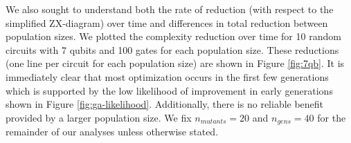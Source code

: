 We also sought to understand both the rate of reduction (with respect to the simplified ZX-diagram) over time and differences in total reduction between population sizes.
We plotted the complexity reduction over time for 10 random circuits with 7 qubits and 100 gates for each population size.
These reductions (one line per circuit for each population size) are shown in Figure \ref{fig:7qb}.
It is immediately clear that most optimization occurs in the first few generations which is supported by the low likelihood of improvement in early generations shown in Figure \ref{fig:ga-likelihood}.
Additionally, there is no reliable benefit provided by a larger population size.
We fix $n_{mutants} = 20$ and $n_{gens} = 40$ for the remainder of our analyses unless otherwise stated.


